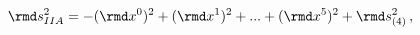 \begin{equation} \label{ALEIIA}
\rmd s^2_{IIA}=-(\rmd x^0)^2+(\rmd x^1)^2+...+(\rmd x^5)^2+ \rmd
s^2_{(4)} \,,
\end{equation}

